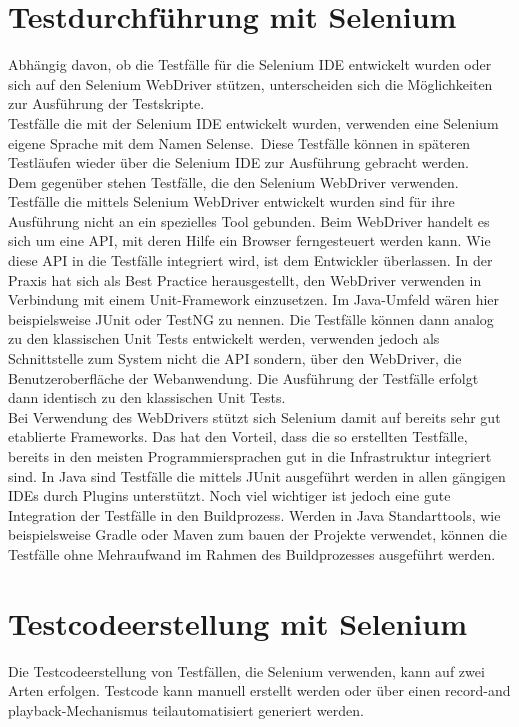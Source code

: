 \section{Testdurchführung mit Selenium}
\label{sec:testdurchführung_mit_selenium}
Abhängig davon, ob die Testfälle für die Selenium IDE entwickelt wurden oder sich auf den Selenium WebDriver stützen, unterscheiden sich die Möglichkeiten zur Ausführung der Testskripte.\\
Testfälle die mit der Selenium IDE entwickelt wurden, verwenden eine Selenium eigene Sprache mit dem Namen \grq Selense\grq.\ Diese Testfälle können in späteren Testläufen wieder über die Selenium IDE zur Ausführung gebracht werden. \\
Dem gegenüber stehen Testfälle, die den Selenium WebDriver verwenden.
Testfälle die mittels Selenium WebDriver entwickelt wurden sind für ihre Ausführung nicht an ein spezielles Tool gebunden. Beim WebDriver handelt es sich um eine API, mit deren Hilfe ein Browser ferngesteuert werden kann. Wie diese API in die Testfälle integriert wird, ist dem Entwickler überlassen. In der Praxis hat sich als Best Practice herausgestellt, den WebDriver verwenden in Verbindung mit einem Unit-Framework einzusetzen.
Im Java-Umfeld wären hier beispielsweise JUnit oder TestNG zu nennen.
Die Testfälle können dann analog zu den klassischen Unit Tests entwickelt werden, verwenden jedoch als Schnittstelle zum System nicht die API sondern, über den WebDriver, die Benutzeroberfläche der Webanwendung. 
Die Ausführung der Testfälle erfolgt dann identisch zu den klassischen Unit Tests.\\
Bei Verwendung des WebDrivers stützt sich Selenium damit auf bereits sehr gut etablierte Frameworks. Das hat den Vorteil, dass die so erstellten Testfälle, bereits in den meisten Programmiersprachen gut in die Infrastruktur integriert sind. In Java sind Testfälle die mittels JUnit ausgeführt werden in allen gängigen IDEs durch Plugins unterstützt. Noch viel wichtiger ist jedoch eine gute Integration der Testfälle in den Buildprozess. Werden in Java Standarttools, wie beispielsweise Gradle oder Maven zum bauen der Projekte verwendet, können die Testfälle ohne Mehraufwand im Rahmen des Buildprozesses ausgeführt werden.



\section{Testcodeerstellung mit Selenium}
\label{sec:Testdesign}
Die Testcodeerstellung von Testfällen, die Selenium verwenden, kann auf zwei Arten erfolgen.
Testcode kann manuell erstellt werden oder über einen \grq record-and playback\grq -Mechanismus teilautomatisiert generiert werden.

